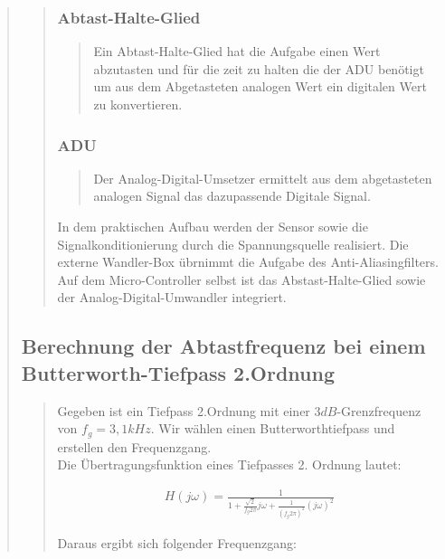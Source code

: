 \begin{quote}
\begin{quote}
		\subsubsection{Abtast-Halte-Glied}
        \begin{quote}
            Ein Abtast-Halte-Glied hat die Aufgabe einen Wert abzutasten und für die zeit zu halten die der ADU
            benötigt um aus dem Abgetasteten analogen Wert ein digitalen Wert zu konvertieren.
        \end{quote}
        \subsubsection{ADU}
		\begin{quote}
			Der Analog-Digital-Umsetzer ermittelt aus dem abgetasteten analogen Signal das dazupassende Digitale Signal.\\
		\end{quote}
		
		In dem praktischen Aufbau werden der Sensor sowie die Signalkonditionierung durch die Spannungsquelle realisiert.
		Die externe Wandler-Box übrnimmt die Aufgabe des Anti-Aliasingfilters. Auf dem Micro-Controller selbst ist das
		Abstast-Halte-Glied sowie der Analog-Digital-Umwandler integriert.
    \end{quote}
    
    \subsection{Berechnung der Abtastfrequenz bei einem Butterworth-Tiefpass 2.Ordnung}
    \begin{quote}
        Gegeben ist ein Tiefpass 2.Ordnung mit einer $3dB$-Grenzfrequenz von $f_g=3,1kHz$. Wir wählen einen
        Butterworthtiefpass und erstellen den Frequenzgang.\\
        Die Übertragungsfunktion eines Tiefpasses 2. Ordnung lautet:
        
        \begin{equation*}
        	\begin{split}
        		H(j\omega) = \frac{1}{1 + \frac{\sqrt{2}}{f_g 2 \pi}j\omega + \frac{1}{(f_g 2 \pi)^2}(j\omega)^2}
        	\end{split}
        \end{equation*}
        
        Daraus ergibt sich folgender Frequenzgang:
        

\end{quote}
\end{quote}
